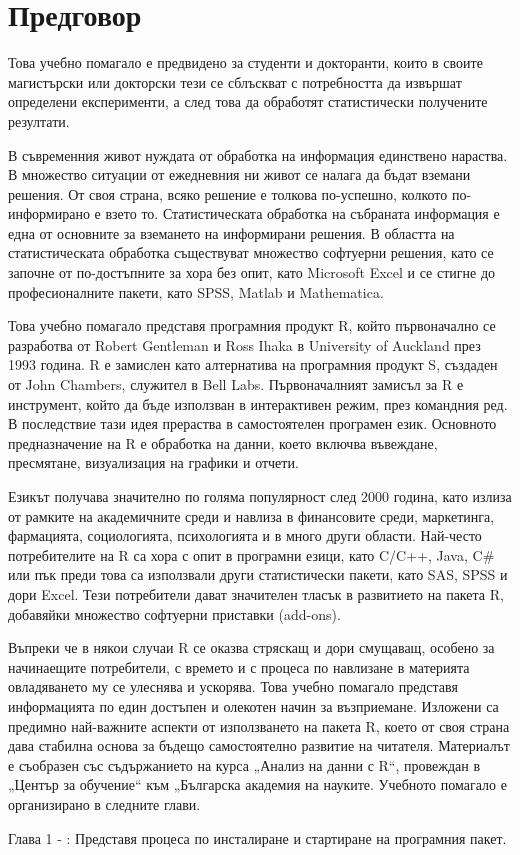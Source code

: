 \newpage
{}
\chapter*{Предговор}
\setcounter{page}{1}
\pagestyle{fancyplain}

Това учебно помагало е предвидено за студенти и докторанти, които в своите магистърски или докторски тези се сблъскват с потребността да извършат определени експерименти, а след това да обработят статистически получените резултати. 

В съвременния живот нуждата от обработка на информация единствено нараства. В множество ситуации от ежедневния ни живот се налага да бъдат вземани решения. От своя страна, всяко решение е толкова по-успешно, колкото по-информирано е взето то. Статистическата обработка на събраната информация е една от основните за вземането на информирани решения. В областта на статистическата обработка съществуват множество софтуерни решения, като се започне от по-достъпните за хора без опит, като Microsoft Excel и се стигне до професионалните пакети, като SPSS, Matlab и Mathematica. 

Това учебно помагало представя програмния продукт R, който първоначално се разработва от Robert Gentleman и Ross Ihaka в University of Auckland през 1993 година. R е замислен като алтернатива на програмния продукт S, създаден от John Chambers, служител в Bell Labs. Първоначалният замисъл за R е инструмент, който да бъде използван в интерактивен режим, през командния ред. В последствие тази идея прераства в самостоятелен програмен език. Основното предназначение на R е обработка на данни, което включва въвеждане, пресмятане, визуализация на графики и отчети. 

Езикът получава значително по голяма популярност след 2000 година, като излиза от рамките на академичните среди и навлиза в финансовите среди, маркетинга, фармацията, социологията, психологията и в много други области. Най-често потребителите на R са хора с опит в програмни езици, като C/C++, Java, C\# или пък преди това са използвали други статистически пакети, като SAS, SPSS и дори Excel. Тези потребители дават значителен тласък в развитието на пакета R, добавяйки множество софтуерни приставки (add-ons). 

Въпреки че в някои случаи R се оказва стряскащ и дори смущаващ, особено за начинаещите потребители, с времето и с процеса по навлизане в материята овладяването му се улеснява и ускорява. Това учебно помагало представя информацията по един достъпен и олекотен начин за възприемане. Изложени са предимно най-важните аспекти от използването на пакета R, което от своя страна дава стабилна основа за бъдещо самостоятелно развитие на читателя. Материалът е съобразен със съдържанието на курса „Анализ на данни с R“, провеждан в „Център за обучение“ към „Българска академия на науките. Учебното помагало е организирано в следните глави.

Глава 1 - : Представя процеса по инсталиране и стартиране на програмния пакет.
